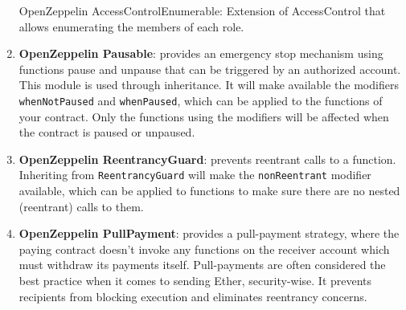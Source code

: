 \begin{enumerate}
OpenZeppelin AccessControlEnumerable: Extension of AccessControl that allows enumerating the members of each role.

\item\textbf{OpenZeppelin Pausable}: provides an emergency stop mechanism using functions pause and unpause that can be triggered by an authorized account. This module is used through inheritance. It will make available the modifiers \verb|whenNotPaused| and \verb|whenPaused|, which can be applied to the functions of your contract. Only the functions using the modifiers will be affected when the contract is paused or unpaused.

\item\textbf{OpenZeppelin ReentrancyGuard}: prevents reentrant calls to a function. Inheriting from \verb|ReentrancyGuard| will make the \verb|nonReentrant| modifier available, which can be applied to functions to make sure there are no nested (reentrant) calls to them.

\item\textbf{OpenZeppelin PullPayment}: provides a pull-payment strategy, where the paying contract doesn’t invoke any functions on the receiver account which must withdraw its payments itself. Pull-payments are often considered the best practice when it comes to sending Ether, security-wise. It prevents recipients from blocking execution and eliminates reentrancy concerns.


\end{enumerate}
